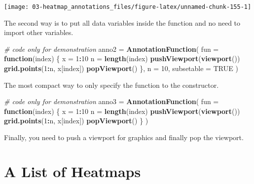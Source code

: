 \documentclass[]{book}
\newenvironment{Shaded}{\begin{snugshade}}{\end{snugshade}}
\newcommand{\KeywordTok}[1]{\textcolor[rgb]{0.13,0.29,0.53}{\textbf{#1}}}
\newcommand{\DataTypeTok}[1]{\textcolor[rgb]{0.13,0.29,0.53}{#1}}
\newcommand{\DecValTok}[1]{\textcolor[rgb]{0.00,0.00,0.81}{#1}}
\newcommand{\StringTok}[1]{\textcolor[rgb]{0.31,0.60,0.02}{#1}}
\newcommand{\CommentTok}[1]{\textcolor[rgb]{0.56,0.35,0.01}{\textit{#1}}}
\newcommand{\OtherTok}[1]{\textcolor[rgb]{0.56,0.35,0.01}{#1}}
\newcommand{\ControlFlowTok}[1]{\textcolor[rgb]{0.13,0.29,0.53}{\textbf{#1}}}
\newcommand{\OperatorTok}[1]{\textcolor[rgb]{0.81,0.36,0.00}{\textbf{#1}}}
\newcommand{\NormalTok}[1]{#1}
\theoremstyle{definition}
\theoremstyle{definition}
\theoremstyle{definition}
\theoremstyle{remark}
\begin{document}
\begin{center}\texttt{[image: 03-heatmap\_annotations\_files/figure-latex/unnamed-chunk-155-1]} \end{center}

The second way is to put all data variables inside the function and no
need to import other variables.

\begin{Shaded}
\begin{Highlighting}[]
\CommentTok{# code only for demonstration}
\NormalTok{anno2 =}\StringTok{ }\KeywordTok{AnnotationFunction}\NormalTok{(}
    \DataTypeTok{fun =} \ControlFlowTok{function}\NormalTok{(index) \{}
\NormalTok{        x =}\StringTok{ }\DecValTok{1}\OperatorTok{:}\DecValTok{10}
\NormalTok{        n =}\StringTok{ }\KeywordTok{length}\NormalTok{(index)}
        \KeywordTok{pushViewport}\NormalTok{(}\KeywordTok{viewport}\NormalTok{())}
        \KeywordTok{grid.points}\NormalTok{(}\DecValTok{1}\OperatorTok{:}\NormalTok{n, x[index])}
        \KeywordTok{popViewport}\NormalTok{()}
\NormalTok{    \},}
    \DataTypeTok{n =} \DecValTok{10}\NormalTok{,}
    \DataTypeTok{subsetable =} \OtherTok{TRUE}
\NormalTok{)}
\end{Highlighting}
\end{Shaded}

The most compact way to only specify the function to the constructor.

\begin{Shaded}
\begin{Highlighting}[]
\CommentTok{# code only for demonstration}
\NormalTok{anno3 =}\StringTok{ }\KeywordTok{AnnotationFunction}\NormalTok{(}
    \DataTypeTok{fun =} \ControlFlowTok{function}\NormalTok{(index) \{}
\NormalTok{        x =}\StringTok{ }\DecValTok{1}\OperatorTok{:}\DecValTok{10}
\NormalTok{        n =}\StringTok{ }\KeywordTok{length}\NormalTok{(index)}
        \KeywordTok{pushViewport}\NormalTok{(}\KeywordTok{viewport}\NormalTok{())}
        \KeywordTok{grid.points}\NormalTok{(}\DecValTok{1}\OperatorTok{:}\NormalTok{n, x[index])}
        \KeywordTok{popViewport}\NormalTok{()}
\NormalTok{    \}}
\NormalTok{)}
\end{Highlighting}
\end{Shaded}

Finally, you need to push a viewport for graphics and finally pop the
viewport.

\chapter{A List of Heatmaps}\label{a-list-of-heatmaps}
\end{document}
